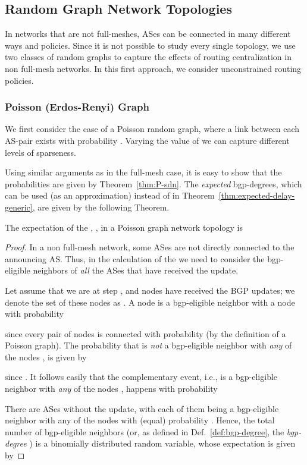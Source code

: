 \subsection{Random Graph Network Topologies}

In networks that are not full-meshes, ASes can be connected in many different ways and policies. Since it is not possible to study every single topology, we use two classes of random graphs to capture the effects of routing centralization in non full-mesh networks. In this first approach, we consider unconstrained routing policies.



\subsubsection{Poisson (Erdos-Renyi) Graph}
We first consider the case of a Poisson random graph, where a link between each AS-pair exists with probability . Varying the value of  we can capture different levels of sparseness.

Using similar arguments as in the full-mesh case, it is easy to show that the probabilities  are given by Theorem~\ref{thm:P-sdn}. The \textit{expected} bgp-degrees, which can be used (as an approximation) instead of  in Theorem~\ref{thm:expected-delay-generic}, are given by the following Theorem. 
\begin{theorem}\label{thm:Dix-poisson}
The expectation of the \bgp , , in a Poisson graph network topology is

\end{theorem}
\begin{proof}
In a non full-mesh network, some ASes are not directly connected to the announcing AS. Thus, in the calculation of the  we need to consider the bgp-eligible neighbors of \textit{all} the ASes that have received the update.

Let assume that we are at step , and  nodes have received the BGP updates; we denote the set of these nodes as . A node  is a bgp-eligible neighbor with a node  with probability

since every pair of nodes is connected with probability  (by the definition of a Poisson graph). The probability that  is \textit{not} a bgp-eligible neighbor with \textit{any} of the nodes , is given by

since . It follows easily that the complementary event, i.e.,  is a bgp-eligible neighbor with \textit{any} of the nodes , happens with probability


There are  ASes without the update, with each of them being a bgp-eligible neighbor with any of the nodes  with (equal) probability . Hence, the total number of bgp-eligible neighbors (or, as defined in Def.~\ref{def:bgp-degree}, the \textit{bgp-degree} ) is a binomially distributed random variable, whose expectation is given by 

\end{proof}


